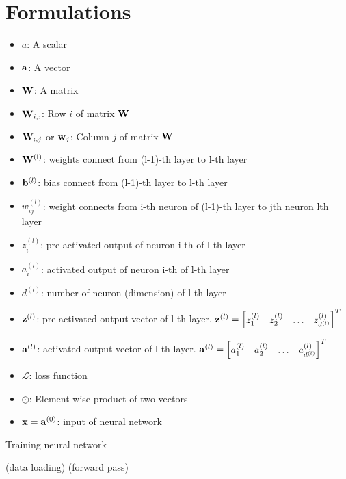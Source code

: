 \documentclass[14pt, a4paper]{article}
\numberwithin{equation}{section}
\numberwithin{algorithm}{section}
\numberwithin{figure}{section}
\begin{document}
\section{Formulations}

\begin{itemize}
  \item $a$: A scalar
    \item $\bold{a}$: A vector
    \item $\bold{W}$: A matrix
     \item $\bold{W}_{i,:}$: Row $i$ of matrix $\bold{W}$
      \item $\bold{W}_{:,j}$ or $\bold{w}_j$: Column $j$ of matrix $\bold{W}$
       \item $\bold{W^{(l)}}$: weights connect from (l-1)-th layer to l-th layer
      \item $\bold{b}^{(l)}$: bias connect from (l-1)-th layer to l-th layer
      \item $w_{ij}^{(l)}$: weight connects from i-th neuron of (l-1)-th layer to jth neuron lth layer
      \item $z_{i}^{(l)}$: pre-activated output of neuron i-th of l-th layer
      \item $a_{i}^{(l)}$: activated output of neuron i-th of l-th layer
      \item $d^{(l)}$: number of neuron (dimension) of l-th layer
      \item $\bold{z}^{(l)}$: pre-activated output vector of l-th layer. $\bold{z}^{(l)} = \begin{bmatrix} z_1^{(l)} & z_2^{(l)} & \dots & z_{d^{(l)}}^{(l)}\end{bmatrix}^T$
      \item $\bold{a}^{(l)}$: activated output vector of l-th layer. $\bold{a}^{(l)} = \begin{bmatrix} a_1^{(l)} & a_2^{(l)} &\dots & a_{d^{(l)}}^{(l)}\end{bmatrix}^T$
      \item $\mathcal{L}$: loss function
      \item $\odot$: Element-wise product of two vectors
      \item $\bold{x}=\bold{a}^{(0)}$: input of neural network
\end{itemize}

\begin{algorithm}[h!]
  \caption{Training neural network}
  \begin{algorithmic}[1]
       (data loading)
       (forward pass)
    \EndWhile
  \end{algorithmic}
\end{algorithm}
\end{document}
